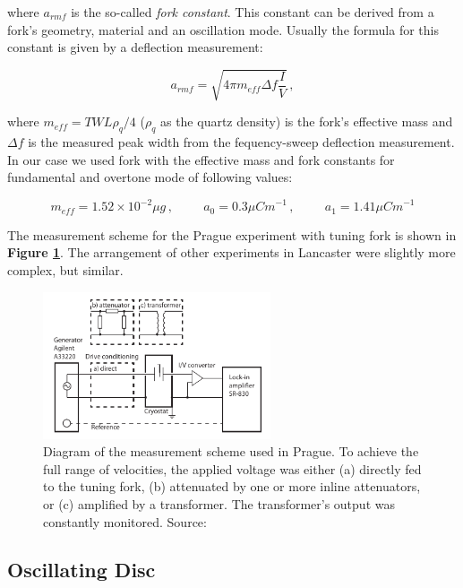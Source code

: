 where $a_{rmf}$ is the so-called \textit{fork constant}. This constant can be derived from a fork's geometry, material and an oscillation mode. Usually the formula for this constant is given by a deflection measurement:

\begin{equation}
a_{rmf} = \sqrt{4\pi m_{eff} \Delta f \frac{I}{V}}\,,
\end{equation}

where $m_{eff} = TWL\rho_q /4$ ($\rho_q$ as the quartz density) is the fork's effective mass and $\Delta f$ is the measured peak width from the fequency-sweep deflection measurement. In our case we used fork with the effective mass and fork constants for fundamental and overtone mode of following values:

\begin{equation}
m_{eff} = 1.52 \times 10^{-2} \mu\unit{g}\,,
\hspace{1cm}
a_0 = 0.3 \mu\unit{Cm}^{-1}\,,
\hspace{1cm}
a_1 = 1.41 \mu\unit{Cm}^{-1}
\end{equation}

The measurement scheme for the Prague experiment with tuning fork is shown in \textbf{Figure \ref{setup}}. The arrangement of other experiments in Lancaster were slightly more complex, but similar.

\begin{figure}[h]
	\centering
	\includegraphics[width=0.6\textwidth]{graphics/exp/fork_setup}
	\caption{Diagram of the measurement scheme used in Prague. To achieve the full range of velocities, the applied voltage was either (a) directly fed to the tuning fork, (b) attenuated by one or more inline attenuators, or (c) amplified by a transformer. The transformer’s output was constantly monitored. Source: \cite{multiple-vels}}
	\label{setup}
\end{figure}

\newpage

\subsection*{Oscillating Disc}

